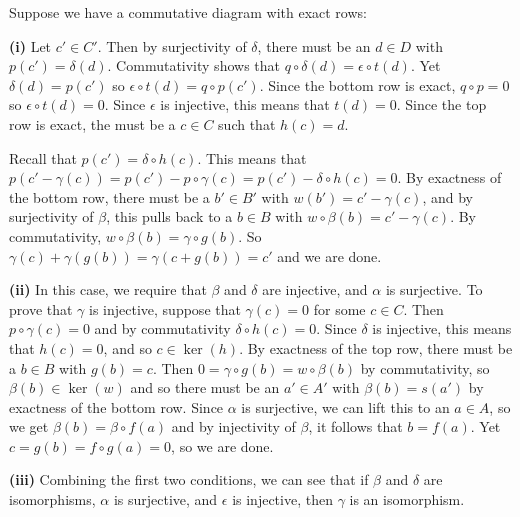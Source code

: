 \documentclass[11pt,letterpaper]{article}
\begin{document}
\begin{solution}
    Suppose we have a commutative diagram with exact rows:
    \begin{center}
    \end{center}
    \textbf{(i)} Let $c'\in C'$. Then by surjectivity of $\delta$, there must be an $d\in D$ with $p(c')=\delta(d)$. Commutativity shows that $q\circ\delta(d)=\epsilon\circ t(d)$. Yet $\delta(d)=p(c')$ so $\epsilon\circ t(d)=q\circ p(c')$. Since the bottom row is exact, $q\circ p=0$ so $\epsilon\circ t(d)=0$. Since $\epsilon$ is injective, this means that $t(d)=0$. Since the top row is exact, the must be a $c\in C$ such that $h(c)=d$.

    Recall that $p(c')=\delta\circ h(c)$. This means that $p(c'-\gamma(c))=p(c')-p\circ \gamma(c)=p(c')-\delta\circ h(c)=0$. By exactness of the bottom row, there must be a $b'\in B'$ with $w(b')=c'-\gamma(c)$, and by surjectivity of $\beta$, this pulls back to a $b\in B$ with $w\circ \beta(b)=c'-\gamma(c)$. By commutativity, $w\circ \beta(b)=\gamma\circ g(b)$. So $\gamma(c)+\gamma(g(b))=\gamma(c+g(b))=c'$ and we are done. 

    \textbf{(ii)} In this case, we require that $\beta$ and $\delta$ are injective, and $\alpha$ is surjective. To prove that $\gamma$ is injective, suppose that $\gamma(c)=0$ for some $c\in C$. Then $p\circ \gamma(c)=0$ and by commutativity $\delta\circ h(c)=0$. Since $\delta$ is injective, this means that $h(c)=0$, and so $c\in \ker(h)$. By exactness of the top row, there must be a $b\in B$ with $g(b)=c$. Then $0=\gamma\circ g(b)=w\circ \beta(b)$ by commutativity, so $\beta(b)\in \ker(w)$ and so there must be an $a'\in A'$ with $\beta(b)=s(a')$ by exactness of the bottom row. Since $\alpha$ is surjective, we can lift this to an $a\in A$, so we get $\beta(b)=\beta\circ f(a)$ and by injectivity of $\beta$, it follows that $b=f(a)$. Yet $c=g(b)=f\circ g(a)=0$, so we are done.  

    \textbf{(iii)} Combining the first two conditions, we can see that if $\beta$ and $\delta$ are isomorphisms, $\alpha$ is surjective, and $\epsilon$ is injective, then $\gamma$ is an isomorphism.


\end{solution}
\end{document}
